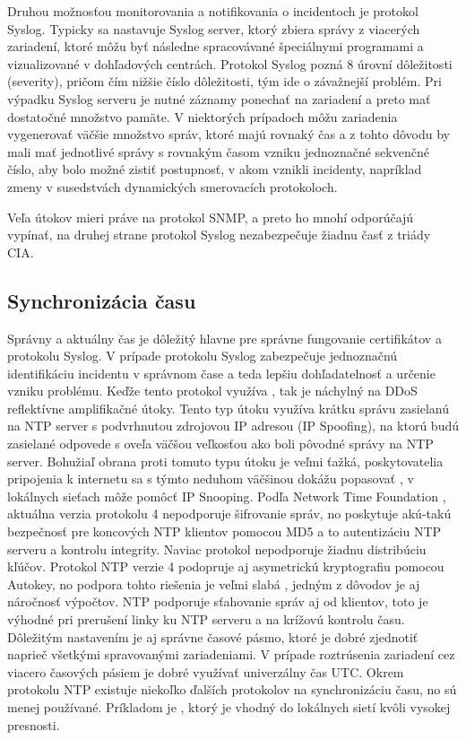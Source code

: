 Druhou možnosťou monitorovania a notifikovania o incidentoch je protokol Syslog. Typicky sa nastavuje Syslog server, ktorý zbiera správy z viacerých zariadení, ktoré môžu byť následne spracovávané špeciálnymi programami a vizualizované v dohľadových centrách. Protokol Syslog pozná 8 úrovní dôležitosti (severity), pričom čím nižšie číslo dôležitosti, tým ide o závažnejší problém. Pri výpadku Syslog serveru je nutné záznamy ponechať na zariadení a preto mať dostatočné množstvo pamäte. V niektorých prípadoch môžu zariadenia vygenerovať väčšie množstvo správ, ktoré majú rovnaký čas a z tohto dôvodu by mali mať jednotlivé správy s rovnakým časom vzniku jednoznačné sekvenčné číslo, aby bolo možné zistiť postupnosť, v akom vznikli incidenty, napríklad zmeny v susedstvách dynamických smerovacích protokoloch.

Veľa útokov mieri práve na protokol SNMP, a preto ho mnohí odporúčajú vypínať, na druhej strane protokol Syslog nezabezpečuje žiadnu časť z triády CIA.   


\subsection*{Synchronizácia času}
Správny a aktuálny čas je dôležitý hlavne pre správne fungovanie certifikátov a protokolu Syslog. V prípade protokolu Syslog zabezpečuje jednoznačnú identifikáciu incidentu v správnom čase a teda lepšiu dohľadatelnosť a určenie vzniku problému. Keďže tento protokol využíva , tak je náchylný na DDoS reflektívne amplifikačné útoky. Tento typ útoku využíva krátku správu zasielanú na NTP server s podvrhnutou zdrojovou IP adresou (IP Spoofing), na ktorú budú zasielané odpovede s oveľa väčšou veľkosťou ako boli pôvodné správy na NTP server. Bohužiaľ obrana proti tomuto typu útoku je veľmi ťažká, poskytovatelia pripojenia k internetu sa s týmto neduhom väčšinou dokážu popasovať \cite{gTkmbyKon9H6tuAm}, v lokálnych sieťach môže pomôcť IP Snooping. Podľa Network Time Foundation \cite{s0goWNnWp5OjqREE}, aktuálna verzia protokolu 4 nepodporuje šifrovanie správ, no poskytuje akú-takú bezpečnosť pre koncových NTP klientov pomocou MD5 a to autentizáciu NTP serveru a kontrolu integrity. Naviac protokol nepodporuje žiadnu distribúciu kľúčov. Protokol NTP verzie 4 podopruje aj asymetrickú kryptografiu pomocou Autokey, no podpora tohto riešenia je veľmi slabá \cite{s0goWNnWp5OjqREE}, jedným z dôvodov je aj náročnosť výpočtov. NTP podporuje sťahovanie správ aj od klientov, toto je výhodné pri prerušení linky ku NTP serveru a na krížovú kontrolu času. Dôležitým nastavením je aj správne časové pásmo, ktoré je dobré zjednotiť naprieč všetkými spravovanými zariadeniami. V prípade roztrúsenia zariadení cez viacero časových pásiem je dobré využívať univerzálny čas UTC. Okrem protokolu NTP existuje niekoľko ďalších protokolov na synchronizáciu času, no sú menej používané. Príkladom je , ktorý je vhodný do lokálnych sietí kvôli vysokej presnosti. 

